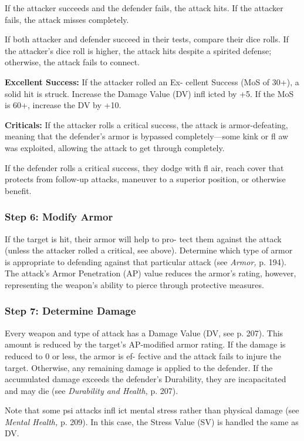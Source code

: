 If the attacker succeeds and the defender fails, 
the attack hits. If the attacker fails, the attack 
misses completely.

If both attacker and defender succeed in their 
tests, compare their dice rolls. If the attacker's 
dice roll is higher, the attack hits despite a spirited 
defense; otherwise, the attack fails to connect.

\textbf{Excellent Success:} If the attacker rolled an Ex-
cellent Success (MoS of 30+), a solid hit is struck. 
Increase the Damage Value (DV) infl icted by +5. If 
the MoS is 60+, increase the DV by +10.

\textbf{Criticals:} If the attacker rolls a critical success, 
the attack is armor-defeating, meaning that the 
defender's armor is bypassed completely—some 
kink or fl aw was exploited, allowing the attack to 
get through completely.

If the defender rolls a critical success, they 
dodge with fl air, reach cover that protects from 
follow-up attacks, maneuver to a superior position, 
or otherwise benefit.

\subsubsection{Step 6: Modify Armor}

If the target is hit, their armor will help to pro-
tect them against the attack (unless the attacker 
rolled a critical, see above). Determine which type 
of armor is appropriate to defending against that 
particular attack (see \textit{Armor,} p. 194). The attack's 
Armor Penetration (AP) value reduces the armor's 
rating, however, representing the weapon's ability 
to pierce through protective measures.

\subsubsection{Step 7: Determine Damage}

Every weapon and type of attack has a Damage 
Value (DV, see p. 207). This amount is reduced 
by the target's AP-modified armor rating. If the 
damage is reduced to 0 or less, the armor is ef-
fective and the attack fails to injure the target. 
Otherwise, any remaining damage is applied to the 
defender. If the accumulated damage exceeds the 
defender's Durability, they are incapacitated and 
may die (see \textit{Durability and Health,} p. 207).

Note that some psi attacks infl ict mental stress 
rather than physical damage (see \textit{Mental Health,} p. 
209). In this case, the Stress Value (SV) is handled 
the same as DV.

